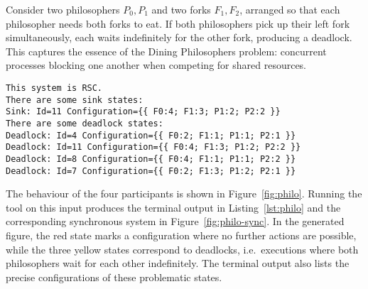 \begin{example}\label{exm:philo}
Consider two philosophers $P_0, P_1$ and two forks $F_1, F_2$, arranged
so that each philosopher needs both forks to eat. If both philosophers
pick up their left fork simultaneously, each waits indefinitely for the
other fork, producing a deadlock. This captures the essence of the Dining
Philosophers problem: concurrent processes blocking one another when
competing for shared resources.

\begin{lstlisting}[language={},caption={Output of Example~\ref{exm:philo}},
    label={lst:philo}]
This system is RSC.
There are some sink states:
Sink: Id=11 Configuration={{ F0:4; F1:3; P1:2; P2:2 }}
There are some deadlock states:
Deadlock: Id=4 Configuration={{ F0:2; F1:1; P1:1; P2:1 }}
Deadlock: Id=11 Configuration={{ F0:4; F1:3; P1:2; P2:2 }}
Deadlock: Id=8 Configuration={{ F0:4; F1:1; P1:1; P2:2 }}
Deadlock: Id=7 Configuration={{ F0:2; F1:3; P1:2; P2:1 }}
\end{lstlisting}

The behaviour of the four participants is shown in
Figure~\ref{fig:philo}. Running the tool on
this input produces the terminal output in
Listing~\ref{lst:philo} and the corresponding synchronous system in
Figure~\ref{fig:philo-sync}. In the
generated figure, the red state marks a configuration where no further
actions are possible, while the three yellow states correspond to
deadlocks, i.e.\ executions where both philosophers wait for each other
indefinitely. The terminal output also lists the precise configurations
of these problematic states.

\newpage


\end{example}
